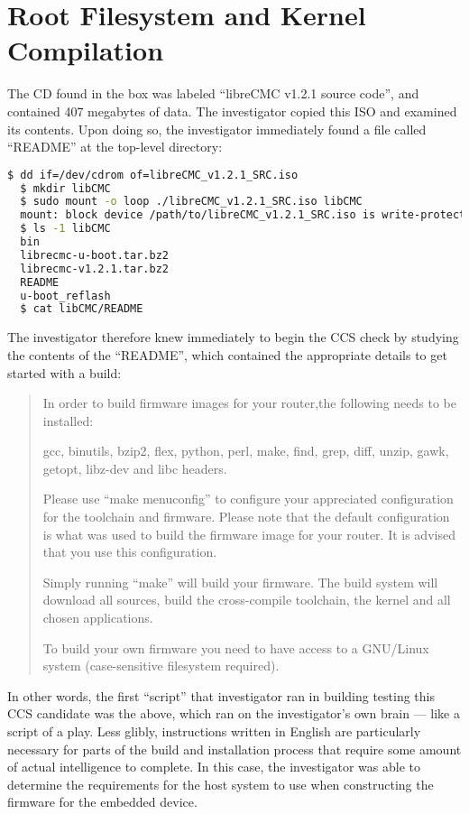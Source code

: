 \section{Root Filesystem and Kernel Compilation}

The CD found in the box was labeled ``libreCMC v1.2.1 source code'', and
contained 407 megabytes of data.  The investigator copied this ISO and
examined its contents.  Upon doing so, the investigator immediately found a
file called ``README'' at the top-level directory:

\lstset{tabsize=2}
\begin{lstlisting}[language=bash]
  $ dd if=/dev/cdrom of=libreCMC_v1.2.1_SRC.iso
  $ mkdir libCMC
  $ sudo mount -o loop ./libreCMC_v1.2.1_SRC.iso libCMC
  mount: block device /path/to/libreCMC_v1.2.1_SRC.iso is write-protected, mounting read-only
  $ ls -1 libCMC
  bin
  librecmc-u-boot.tar.bz2
  librecmc-v1.2.1.tar.bz2
  README
  u-boot_reflash
  $ cat libCMC/README
\end{lstlisting}
\label{thinkpenguin-toplevel-readme}
The investigator therefore knew immediately to begin the CCS check by
studying the contents of the ``README'', which contained the appropriate
details to get started with a build:
\begin{quotation}

In order to build firmware images for your router,the following needs to be
installed:

gcc, binutils, bzip2, flex, python, perl, make, find, grep, diff, unzip,
gawk, getopt, libz-dev and libc headers.

Please use ``make menuconfig'' to configure your appreciated configuration
for the toolchain and firmware. Please note that the default configuration is
what was used to build the firmware image for your router. It is advised that
you use this configuration.

Simply running ``make'' will build your firmware.  The build system will
download all sources, build the cross-compile toolchain, the kernel and all
chosen applications.

To build your own firmware you need to have access to a GNU/Linux system
(case-sensitive filesystem required).
\end{quotation}

In other words, the first ``script'' that investigator ran in building
testing this CCS candidate was the above, which ran on the investigator's own
brain --- like a script of a play.  Less glibly, instructions written in
English are particularly necessary for parts of the build and installation
process that require some amount of actual intelligence to complete.
In this case, the investigator was able to determine the requirements for the
host system to use when constructing the firmware for the embedded device.

